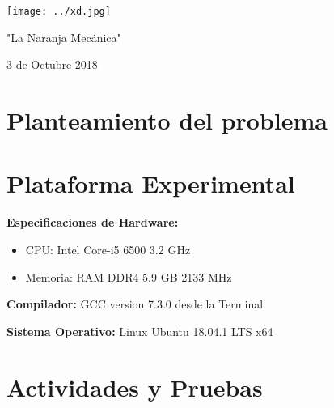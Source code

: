 \documentclass[12pt]{article}
\begin{document}
\begin{titlepage}
\begin{center}
					\begin{minipage}{0.5\textwidth}
					\begin{center} \large
						\texttt{[image: ../xd.jpg]}
						\caption*{"La Naranja Mecánica"}
					\end{center}
				\end{minipage}

				\vfill
				
				{\large 3 de Octubre 2018}
			\end{center}
		\end{titlepage}
	
	\tableofcontents
	\newpage
	\section{Planteamiento del problema}

	
    \section{Plataforma Experimental}
	
	    \textbf{Especificaciones de Hardware:}
	    \begin{itemize}
	        \item CPU: Intel Core-i5 6500 3.2 GHz
	        \item Memoria: RAM DDR4 5.9 GB 2133 MHz
	    \end{itemize}
    
	    \textbf{Compilador:} GCC version 7.3.0 desde la Terminal
	    
	    \textbf{Sistema Operativo:} Linux Ubuntu 18.04.1 LTS x64 

	
	\section{Actividades y Pruebas}
	
\end{document}
